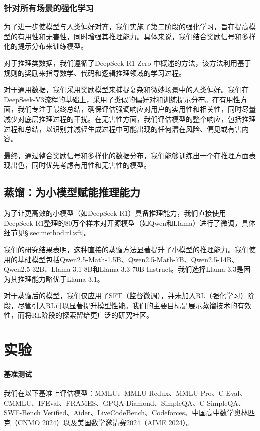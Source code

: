 \documentclass[lang=cn,a4paper,newtx]{elegantpaper}
\newcommand{\dsro}{DeepSeek-R1-Zero}
\begin{document}
\subsubsection{针对所有场景的强化学习}

为了进一步使模型与人类偏好对齐，我们实施了第二阶段的强化学习，旨在提高模型的有用性和无害性，同时增强其推理能力。具体来说，我们结合奖励信号和多样化的提示分布来训练模型。

对于推理类数据，我们遵循了\dsro{} 中概述的方法，该方法利用基于规则的奖励来指导数学、代码和逻辑推理领域的学习过程。

对于通用数据，我们采用奖励模型来捕捉复杂和微妙场景中的人类偏好。我们在DeepSeek-V3流程的基础上，采用了类似的偏好对和训练提示分布。在有用性方面，我们专注于最终总结，确保评估强调响应对用户的实用性和相关性，同时尽量减少对底层推理过程的干扰。在无害性方面，我们评估模型的整个响应，包括推理过程和总结，以识别并减轻生成过程中可能出现的任何潜在风险、偏见或有害内容。

最终，通过整合奖励信号和多样化的数据分布，我们能够训练出一个在推理方面表现出色，同时优先考虑有用性和无害性的模型。

\subsection{蒸馏：为小模型赋能推理能力}

为了让更高效的小模型（如DeepSeek-R1）具备推理能力，我们直接使用DeepSeek-R1整理的80万个样本对开源模型（如Qwen和Llama）进行了微调，具体细节见\S \ref{sec:method:r1:sft}。

我们的研究结果表明，这种直接的蒸馏方法显著提升了小模型的推理能力。我们使用的基础模型包括Qwen2.5-Math-1.5B、Qwen2.5-Math-7B、Qwen2.5-14B、Qwen2.5-32B、Llama-3.1-8B和Llama-3.3-70B-Instruct。我们选择Llama-3.3是因为其推理能力略优于Llama-3.1。

对于蒸馏后的模型，我们仅应用了SFT（监督微调），并未加入RL（强化学习）阶段，尽管引入RL可以显著提升模型性能。我们的主要目标是展示蒸馏技术的有效性，而将RL阶段的探索留给更广泛的研究社区。

\section{实验}

\paragraph{基准测试} 我们在以下基准上评估模型：MMLU、MMLU-Redux、MMLU-Pro、C-Eval、CMMLU、IFEval、FRAMES、GPQA Diamond、SimpleQA、C-SimpleQA、SWE-Bench Verified、Aider、LiveCodeBench、Codeforces、中国高中数学奥林匹克（CNMO 2024）以及美国数学邀请赛2024（AIME 2024）。
\end{document}

